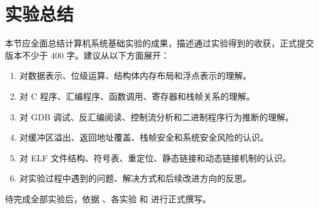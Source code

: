 \section*{实验总结}

本节应全面总结计算机系统基础实验的成果，描述通过实验得到的收获，正式提交版本不少于 400 字。建议从以下方面展开：

\begin{enumerate}[label=\arabic*.]
    \item 对数据表示、位级运算、结构体内存布局和浮点表示的理解。
    \item 对 C 程序、汇编程序、函数调用、寄存器和栈帧关系的理解。
    \item 对 GDB 调试、反汇编阅读、控制流分析和二进制程序行为推断的理解。
    \item 对缓冲区溢出、返回地址覆盖、栈帧安全和系统安全风险的认识。
    \item 对 ELF 文件结构、符号表、重定位、静态链接和动态链接机制的认识。
    \item 对实验过程中遇到的问题、解决方式和后续改进方向的反思。
\end{enumerate}

待完成全部实验后，依据 、各实验  和  进行正式撰写。
